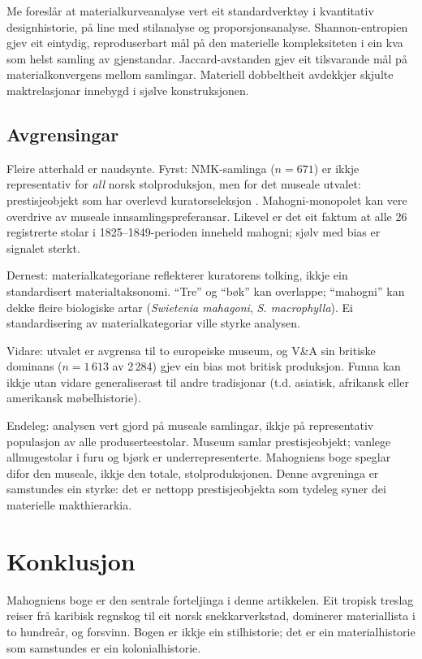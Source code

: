 \documentclass[10pt, a4paper, twocolumn]{article}
\begin{document}
Me foreslår at materialkurveanalyse vert eit standardverktøy i kvantitativ designhistorie, på line med stilanalyse og proporsjonsanalyse. Shannon-entropien gjev eit eintydig, reproduserbart mål på den materielle kompleksiteten i ein kva som helst samling av gjenstandar. Jaccard-avstanden gjev eit tilsvarande mål på materialkonvergens mellom samlingar. Materiell dobbeltheit avdekkjer skjulte maktrelasjonar innebygd i sjølve konstruksjonen.

\subsection{Avgrensingar}

Fleire atterhald er naudsynte. Fyrst: NMK-samlinga ($n = 671$) er ikkje representativ for \emph{all} norsk stolproduksjon, men for det museale utvalet: prestisje\-objekt som har overlevd kuratorseleksjon \citep[jf.][]{bennett1995}. Mahogni-monopolet kan vere overdrive av museale innsamlingspreferansar. Likevel er det eit faktum at alle 26 registrerte stolar i 1825--1849-perioden inneheld mahogni; sjølv med bias er signalet sterkt.

Dernest: materialkategoriane reflekterer kuratorens tolking, ikkje ein standardisert materialtaksonomi. ``Tre'' og ``bøk'' kan overlappe; ``mahogni'' kan dekke fleire biologiske artar (\emph{Swietenia mahagoni}, \emph{S. macrophylla}). Ei standardisering av materialkategoriar ville styrke analysen.

Vidare: utvalet er avgrensa til to europeiske museum, og V\&A sin britiske dominans ($n = 1\,613$ av 2\,284) gjev ein bias mot britisk produksjon. Funna kan ikkje utan vidare generaliserast til andre tradisjonar (t.d. asiatisk, afrikansk eller amerikansk møbelhistorie).

Endeleg: analysen vert gjord på museale samlingar, ikkje på representativ populasjon av alle produserteestolar. Museum samlar prestisjeobjekt; vanlege allmugestolar i furu og bjørk er underrepresenterte. Mahogniens boge speglar difor den museale, ikkje den totale, stolproduksjonen. Denne avgreninga er samstundes ein styrke: det er nettopp prestisjeobjekta som tydeleg syner dei materielle makthierarkia.


\section{Konklusjon}

Mahogniens boge er den sentrale forteljinga i denne artikkelen. Eit tropisk treslag reiser frå karibisk regnskog til eit norsk snekkarverkstad, dominerer materiallista i to hundreår, og forsvinn. Bogen er ikkje ein stilhistorie; det er ein materialhistorie som samstundes er ein kolonialhistorie.
\end{document}
